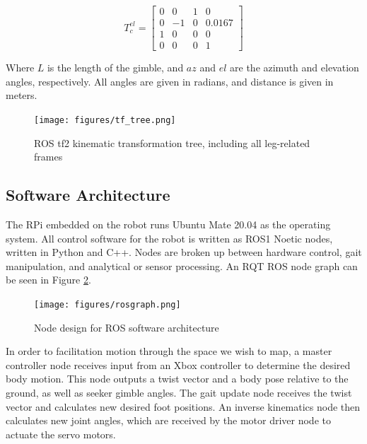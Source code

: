 \begin{itemize}
    \[
    T^{el}_{c} = \begin{bmatrix} 0 &  0 & 1 & 0 \\
                                 0 & -1 & 0 & 0.0167 \\
                                 1 &  0 & 0 & 0 \\
                                 0 &  0 & 0 & 1 \end{bmatrix}
    \]

Where $L$ is the length of the gimble, and $az$ and $el$ are the azimuth and elevation angles, respectively. All angles are given in radians, and distance is given in meters.

\end{itemize}

\begin{figure}[h]
    \centering
    \texttt{[image: figures/tf\_tree.png]}
    \caption{ ROS tf2 \cite{tf2} kinematic transformation tree, including all leg-related frames }
    \label{fig:tf_tree}
\end{figure}

\subsection{ Software Architecture }

The RPi embedded on the robot runs Ubuntu Mate 20.04 as the operating system. All control software for the robot is written as ROS1 Noetic nodes, written in Python and C++. Nodes are broken up between hardware control, gait manipulation, and analytical or sensor processing. An RQT ROS node graph can be seen in Figure \ref{fig:rqt}.


\begin{figure}[h]
    \centering
    \texttt{[image: figures/rosgraph.png]}
    \caption{ Node design for ROS software architecture }
    \label{fig:rqt}
\end{figure}

In order to facilitation motion through the space we wish to map, a master controller node receives input from an Xbox controller to determine the desired body motion. This node outputs a twist vector and a body pose relative to the ground, as well as seeker gimble angles. The gait update node receives the twist vector and calculates new desired foot positions. An inverse kinematics node then calculates new joint angles, which are received by the motor driver node to actuate the servo motors.

